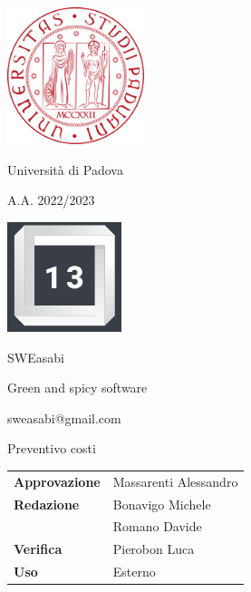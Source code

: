 \documentclass{article}
\begin{document}
\begin{center}
    
    \includegraphics[width=0.3\textwidth]{immagini/logo_unipd.png}

    Università di Padova
    
    A.A. 2022/2023
    
    \vspace{4cm}

    \includegraphics[width=0.25\textwidth]{immagini/logo_13.png}
    
    \Large SWEasabi

    \tiny Green and spicy software

    \small sweasabi@gmail.com
        
    \vspace{2cm}

    \Huge Preventivo costi
        
    \vspace{2cm}
    
    \normalsize
    \begin{center}
        \begin{tabularx}{7cm}{l | X}            
            \textbf{Approvazione} & Massarenti Alessandro\\
            \textbf{Redazione} & Bonavigo Michele \\
            & Romano Davide\\
            \textbf{Verifica} & Pierobon Luca\\
            \hline
            \textbf{Uso} & Esterno\\
        \end{tabularx}
    \end{center}
        
\end{center}

\newpage

\tableofcontents

\newpage


\end{document}
